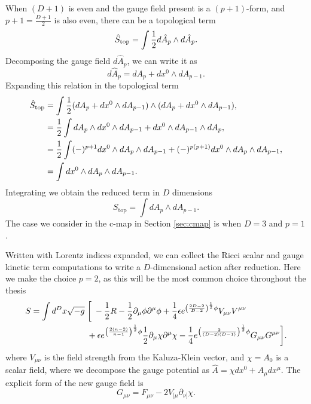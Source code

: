 When $(D+1)$ is even and the gauge field present is a $(p+1)$-form, and $p+1 = \frac{D+1}{2}$ is also even, there can be a topological term
\begin{equation*}
	\hat{S}_{\text{top}} = \int \frac{1}{2} d \hat{A}_p \wedge d \hat{A}_p .
\end{equation*}
Decomposing the gauge field $d\hat{A}_{p}$, we can write it as 
\begin{equation*}
	d\hat{A}_{p} = dA_p + dx^0 \wedge dA_{p-1}.
\end{equation*}
Expanding this relation in the topological term 
\begin{equation*}
\begin{aligned}
		\hat{S}_{\text{top}} &= \int \frac{1}{2} (dA_p + dx^0 \wedge dA_{p-1}) \wedge (dA_p + dx^0 \wedge dA_{p-1}), \\
		&= \frac{1}{2} \int dA_p \wedge dx^0 \wedge dA_{p-1} + dx^0 \wedge dA_{p-1} \wedge dA_p ,\\
		&= \frac{1}{2} \int (-)^{p+1} dx^0 \wedge dA_p \wedge dA_{p-1} + (-)^{p(p+1)}dx^0 \wedge dA_p \wedge dA_{p-1},\\
		&= \int dx^0 \wedge dA_p \wedge dA_{p-1}.
\end{aligned}
\end{equation*}
Integrating we obtain the reduced term in $D$ dimensions
\begin{equation*}
	S_{\text{top}} = \int dA_p \wedge dA_{p-1}.
\end{equation*}
The case we consider in the c-map in Section \ref{sec:cmap} is when $D= 3$ and $p = 1$.

Written with Lorentz indices expanded, we can collect the Ricci scalar and gauge kinetic term computations to write a $D$-dimensional action after reduction. Here we make the choice $p = 2$, as this will be the most common choice throughout the thesis
\begin{equation*}
\begin{aligned}
	S = \int d^D x \sqrt{-g} \; &\bigg[ \;- \frac{1}{2} R - \frac{1}{2} \partial_\mu \phi \partial^\mu \phi + \frac{1}{4} \epsilon e^{\left( \frac{2D-2}{D-2} \right)^{\frac{1}{2}} \phi} V_{\mu \nu}   V^{\mu \nu} \\
	&+ \epsilon e^{\left( \frac{2(n-2)}{n-1} \right)^{\frac{1}{2}} \phi} \frac{1}{2} \partial_\mu \chi \partial^\mu \chi - \frac{1}{4} e^{\left( \frac{2}{(D-2)(D-1)}\right)^{\frac{1}{2}} \phi} G_{\mu \nu} G^{\mu \nu} \bigg].
\end{aligned}
\end{equation*}
where $V_{\mu \nu}$ is the field strength from the Kaluza-Klein vector, and $\chi = A_0$ is a scalar field, where we decompose the gauge potential as $\hat{A} = \chi dx^0 + A_\mu dx^\mu$. The explicit form of the new gauge field is
\begin{equation*}
	G_{\mu \nu} = F_{\mu \nu} - 2V_{[\mu} \partial_{\nu]} \chi.
\end{equation*}

